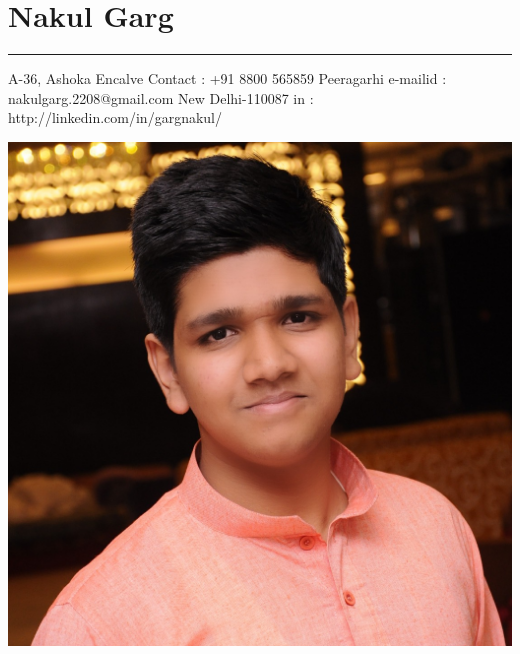 \documentclass[a4paper]{article}
\author{Nakul Garg}
\begin{document}
	
	\section*{\center\textbf\Huge Nakul Garg}
		\hrule
		
		\vspace{2mm}
		A-36, Ashoka Encalve  \hfill {Contact : +91 8800 565859} \newline
		Peeragarhi \hfill {e-mailid : nakulgarg.2208@gmail.com} \newline
		New Delhi-110087 \hfill  {in : http://linkedin.com/in/gargnakul/} \\ 
		\begin{center}
		\includegraphics[scale=0.07]{profile}
		\end{center}
		\centering
\end{document}
